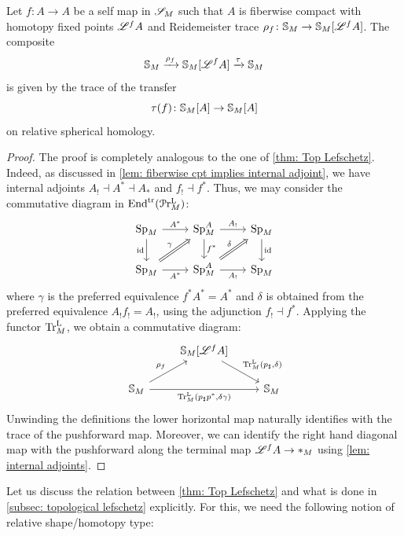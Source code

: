 \begin{thm}\label{thm: Homotopical Lefschetz}
    Let $f\colon A\to A$ be a self map in $\mathscr{S}_{M}$ such that $A$ is fiberwise compact with
    homotopy fixed points $\mathscr{L}^fA$ and Reidemeister trace 
    $\rho_f\colon \mathbb{S}_{M}\to \mathbb{S}_{M}[\mathscr{L}^f A]$.
    The composite
    \[ \mathbb{S}_{M}\xrightarrow{\rho_f} \mathbb{S}_{M}[\mathscr{L}^f A] \xrightarrow{\tau} \mathbb{S}_{M}\]
    is given by the trace of the transfer 
    \[ \tau(f)\colon \mathbb{S}_{M}[A]\to \mathbb{S}_{M}[A]\]
    on relative spherical homology.
\end{thm}
\begin{proof}
    The proof is completely analogous to the one of \autoref{thm: Top Lefschetz}.
    Indeed, as discussed in \autoref{lem: fiberwise cpt implies internal adjoint},
    we have internal adjoints $A_! \dashv A^* \dashv A_*$ and $f_! \dashv f^*$. Thus, we may 
    consider the commutative diagram in $\mathrm{End}^{\mathrm{tr}}(\mathcal{P}\mathrm{r}^{\mathrm{L}}_{M})$:
    \[
  \begin{tikzcd}
	{\pSp{\base}} & {\pSp{\base}[A]} & {\pSp{\base}} \\
	{\pSp{\base}} & {\pSp{\base}[A]} & {\pSp{\base}}
	\arrow["{A^*}", from=1-1, to=1-2]
	\arrow["\id"', from=1-1, to=2-1]
	\arrow["{A_!}", from=1-2, to=1-3]
	\arrow["{f^*}", from=1-2, to=2-2]
	\arrow["\id", from=1-3, to=2-3]
	\arrow["\gamma", Rightarrow, from=2-1, to=1-2]
	\arrow["{A^*}"', from=2-1, to=2-2]
	\arrow["\delta", Rightarrow, from=2-2, to=1-3]
	\arrow["{A_!}"', from=2-2, to=2-3]
  \end{tikzcd} 
    \]
  where $\gamma$ is the preferred equivalence $f^{*}A^*=A^*$ and 
  $\delta$ is obtained from the preferred equivalence $A_{!} f_{!}= A_{!}$, using the adjunction 
  $f_! \dashv f^*$. Applying the functor $\mathrm{Tr}^{\mathrm{L}}_{M}$, we obtain a commutative diagram:
    \[\begin{tikzcd}
	{} & {\SS_{\base}[\cL^fA]} & \\
	{\SS_{\base}} && {\SS_{\base}}
	\arrow["{\TrcL(p_{\sharp},\delta})", from=1-2, to=2-3]
	\arrow["{\rho_f}", from=2-1, to=1-2]
	\arrow["{\TrcL(p_\sharp p^*, \delta\gamma)}"', from=2-1, to=2-3]
\end{tikzcd}\]
   Unwinding the definitions the lower horizontal map naturally identifies with the trace
   of the pushforward map. Moreover, we can identify the right hand
   diagonal map with the pushforward along the terminal map 
   $\mathscr{L}^fA\to \ast_M$ using \cref{lem: internal adjoints}.
\end{proof}

Let us discuss the relation between \cref{thm: Top Lefschetz} and what is 
done in \cref{subsec: topological lefschetz}
explicitly. For this, we need the following notion of relative shape/homotopy type:

